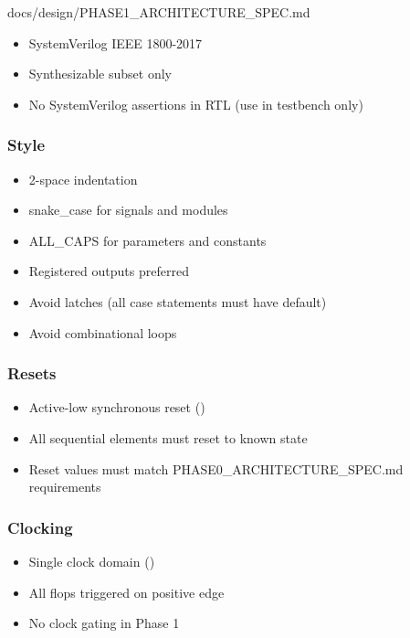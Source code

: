 \begin{relocated}{docs/design/PHASE1_ARCHITECTURE_SPEC.md}
\begin{itemize}
\tightlist
\item
  SystemVerilog IEEE 1800-2017
\item
  Synthesizable subset only
\item
  No SystemVerilog assertions in RTL (use in testbench only)
\end{itemize}

\subsubsection{Style}\label{ds:ch:phase1-architecture:style}

\begin{itemize}
\tightlist
\item
  2-space indentation
\item
  snake\_\allowbreak{}case for signals and modules
\item
  ALL\_CAPS for parameters and constants
\item
  Registered outputs preferred
\item
  Avoid latches (all case statements must have default)
\item
  Avoid combinational loops
\end{itemize}

\subsubsection{Resets}\label{ds:ch:phase1-architecture:resets}

\begin{itemize}
\tightlist
\item
  Active-low synchronous reset ()
\item
  All sequential elements must reset to known state
\item
  Reset values must match
  PHASE0\_\allowbreak{}ARCHITECTURE\_\allowbreak{}SPEC.md requirements
\end{itemize}

\subsubsection{Clocking}\label{ds:ch:phase1-architecture:clocking}

\begin{itemize}
\tightlist
\item
  Single clock domain ()
\item
  All flops triggered on positive edge
\item
  No clock gating in Phase 1
\end{itemize}


\end{relocated}
